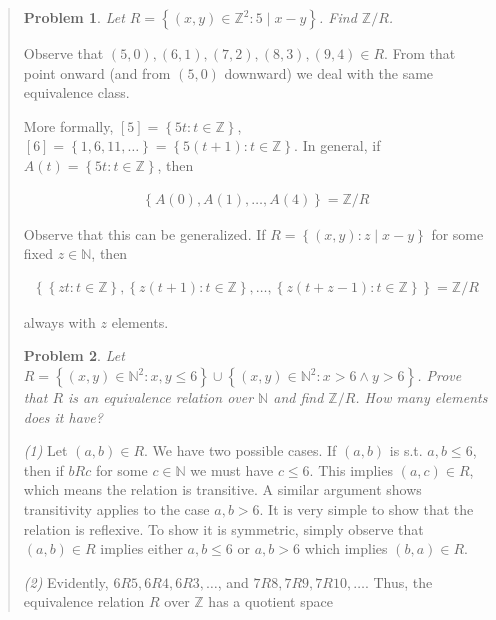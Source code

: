 \documentclass[a4paper, 12pt]{article}
\newtheorem{problem}{Problem}
\newtheorem{problem}{Problem}
\begin{document}
\small
\begin{quote}

\begin{problem}
    Let $R = \left\{ (x, y) \in \mathbb{Z}^2 : 5 \mid x - y \right\} $. Find
    $\mathbb{Z} / R$.
\end{problem}

Observe that $(5, 0), (6, 1), (7, 2), (8, 3), (9, 4) \in R$. From that point
onward (and from $(5, 0)$ downward) we deal with the same equivalence class.


More formally,  $[5] = \left\{ 5t : t \in \mathbb{Z} \right\}
$, $[6] = \left\{ 1, 6, 11, \ldots \right\} = \left\{ 5(t + 1) : t \in
\mathbb{Z} \right\}  $. In general, if $A(t) = \left\{ 5t : t \in \mathbb{Z}
\right\} $, then

\begin{align*}
    \left\{ A(0), A(1), \ldots, A(4) \right\} = \mathbb{Z} / R
\end{align*}

Observe that this can be generalized. If $R = \left\{ (x, y) : z \mid x - y
\right\} $ for some fixed $z \in \mathbb{N}$, then 

\begin{align*}
    \left\{  \left\{ zt : t \in \mathbb{Z} \right\}, \left\{ z(t+1) : t \in
    \mathbb{Z} \right\}, \ldots, \left\{ z(t + z-1) : t \in \mathbb{Z} \right\}
\right\}  = \mathbb{Z}/R
\end{align*}

always with $z$ elements.

\begin{problem}
    Let $R = \left\{ (x, y) \in \mathbb{N}^2 : x, y \leq 6 \right\}  \cup
    \left\{ (x, y) \in \mathbb{N}^2 : x > 6 \land  y > 6 \right\} $. Prove that
    $R$ is an equivalence relation over $\mathbb{N}$ and find $\mathbb{Z} / R$.
    How many elements does it have?
\end{problem}

\textit{(1)} Let $(a, b) \in R$. We have two possible cases. If $(a, b)$ is s.t.
$a, b \leq 6$, then if $b R c$ for some $c \in \mathbb{N}$ we must have $c
\leq 6$. This implies $(a, c) \in R$, which means the relation is transitive. A
similar argument shows transitivity applies to the case $a, b > 6$. It is very
simple to show that the relation is reflexive. To show it is symmetric, simply
observe that $(a, b) \in  R$ implies either $a, b \leq 6$ or $a, b > 6$ which
implies $(b, a) \in  R$.

\textit{(2)} Evidently, $6R 5, 6R 4, 6R 3,\ldots $, and $7 R 8, 7R 9, 7R 10,
\ldots$. Thus, the equivalence relation $R$ over $\mathbb{Z}$ has a quotient space


\end{quote}
\end{document}
